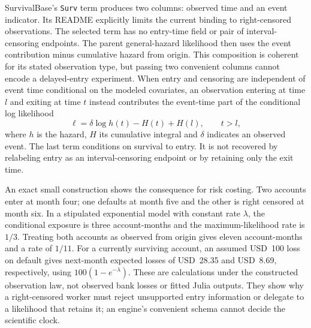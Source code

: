 SurvivalBase's \texttt{Surv} term produces two columns: observed time and an
event indicator. Its README explicitly limits the current binding to
right-censored observations. The selected term has no entry-time field or
pair of interval-censoring endpoints. The parent general-hazard likelihood
then uses the event contribution minus cumulative hazard from origin. This
composition is coherent for its stated observation type, but passing two
convenient columns cannot encode a delayed-entry experiment. When entry and censoring are independent of event time conditional on the
modeled covariates, an observation entering at time $l$ and exiting at time $t$
instead contributes the event-time part of the conditional log likelihood
\begin{equation}
 \ell=\delta\log h(t)-H(t)+H(l),\qquad t>l,
 \label{rel22:entry-likelihood}
\end{equation}
where $h$ is the hazard, $H$ its cumulative integral and $\delta$ indicates an
observed event. The last term conditions on survival to entry. It is not
recovered by relabeling entry as an interval-censoring endpoint or by retaining
only the exit time. \citep{rel22survbase,rel22survcaller,rel22survwitness}

An exact small construction shows the consequence for risk costing. Two
accounts enter at month four; one defaults at month five and the other is
right censored at month six. In a stipulated exponential model with constant
rate $\lambda$, the conditional exposure is three account-months and the
maximum-likelihood rate is $1/3$. Treating both accounts as observed from
origin gives eleven account-months and a rate of $1/11$. For a currently
surviving account, an assumed USD~100 loss on default gives next-month
expected losses of USD~28.35 and USD~8.69, respectively, using
$100(1-e^{-\lambda})$. These are calculations under the constructed
observation law, not observed bank losses or fitted Julia outputs. They show
why a right-censored worker must reject unsupported entry information or
delegate to a likelihood that retains it; an engine's convenient schema
cannot decide the scientific clock. \citep{rel22survwitness}

